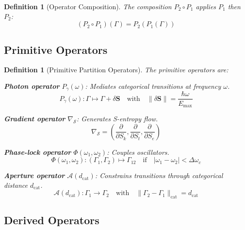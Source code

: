 \documentclass[aps,prd,twocolumn,superscriptaddress,floatfix,nofootinbib]{revtex4-2}
\newtheorem{definition}[theorem]{Definition}
\theoremstyle{remark}
\newcommand{\Sk}{S_k}
\newcommand{\St}{S_t}
\newcommand{\Se}{S_e}
\newcommand{\Sspace}{\mathcal{S}}
\newcommand{\Scoord}{\mathbf{S}}
\newcommand{\Pop}{P}
\newcommand{\Gstate}{\Gamma}
\newcommand{\dcat}{d_{\mathrm{cat}}}
\begin{document}
\begin{definition}[Operator Composition]
\label{def:composition}
The composition $\Pop_2 \circ \Pop_1$ applies $\Pop_1$ then $\Pop_2$:
\begin{equation}
(\Pop_2 \circ \Pop_1)(\Gstate) = \Pop_2(\Pop_1(\Gstate))
\end{equation}
\end{definition}

\subsection{Primitive Operators}

\begin{definition}[Primitive Partition Operators]
\label{def:primitives}
The primitive operators are:

\textbf{Photon operator} $\Pop_\gamma(\omega)$: Mediates categorical transitions at frequency $\omega$.
\begin{equation}
\Pop_\gamma(\omega): \Gstate \mapsto \Gstate + \delta\Scoord \quad \text{with} \quad \|\delta\Scoord\| = \frac{\hbar\omega}{E_{\max}}
\end{equation}

\textbf{Gradient operator} $\nabla_{\Sspace}$: Generates S-entropy flow.
\begin{equation}
\nabla_{\Sspace} = \left(\frac{\partial}{\partial \Sk}, \frac{\partial}{\partial \St}, \frac{\partial}{\partial \Se}\right)
\end{equation}

\textbf{Phase-lock operator} $\Phi(\omega_1, \omega_2)$: Couples oscillators.
\begin{equation}
\Phi(\omega_1, \omega_2): (\Gstate_1, \Gstate_2) \mapsto \Gstate_{12} \quad \text{if} \quad |\omega_1 - \omega_2| < \Delta\omega_c
\end{equation}

\textbf{Aperture operator} $\mathcal{A}(\dcat)$: Constrains transitions through categorical distance $\dcat$.
\begin{equation}
\mathcal{A}(\dcat): \Gstate_1 \to \Gstate_2 \quad \text{with} \quad \|\Gstate_2 - \Gstate_1\|_{\text{cat}} = \dcat
\end{equation}
\end{definition}

\subsection{Derived Operators}
\end{document}
